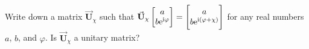\documentclass[11pt,letter]{article}
\newcommand{\vmat}[1]{\vec{\mathbf{#1}}} %
\newcommand{\mathe}{\mathrm{e}}
\newcommand{\mathi}{\mathrm{i}}
\begin{document}
\begin{solution}
\end{solution}

\pagebreak %

\begin{problem}
  Write down a matrix $\vmat{U}_{\chi}$ such that
  $\vmat{U}_{\chi} \begin{bmatrix} a \\ b\mathe^{\mathi\varphi} \end{bmatrix}
  = \begin{bmatrix} a \\ b\mathe^{\mathi\del{\varphi+\chi}} \end{bmatrix}$ for
  any real numbers $a$, $b$, and $\varphi$.  Is $\vmat{U}_{\chi}$ a unitary
  matrix?
\end{problem}

\begin{solution}

\end{solution}


\iftoggle{ccZero}{%
  \vfill%

  \hrule%
  \vspace{\baselineskip}%

  \begin{center}%
    \ccZeroTextNotice{}%
  \end{center}%
}{%
}
\end{document}
